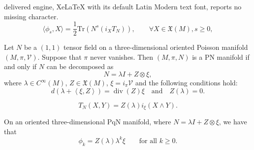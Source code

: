 \documentclass[10pt,a4paper]{amsart}
\begin{document}
delivered engine, XeLaTeX with its default Latin Modern text font, reports no missing character.
\begin{equation}
\langle\phi_s,X\rangle=\frac{1}{2}\text{Tr}(N^s(i_XT_N)),\qquad\forall X\in\mathfrak X(M), s\geq 0, \label{eq:phis}
\end{equation}

\begin{theorem}\label{theo:charN}
Let $N$ be a $(1,1)$ tensor field on a three-dimensional oriented Poisson manifold $(M,\pi,\mathcal V)$. Suppose that $\pi$ never vanishes.
Then $(M,\pi,N)$ is a PN manifold if and only if $N$ can be decomposed as 
\begin{equation}
N=\lambda I+Z\otimes\xi,\label{eq:chPN}
\end{equation}
where $\lambda\in C^\infty(M)$, $Z\in\mathfrak X(M)$, $\xi=i_\pi\mathcal V$ and the following conditions hold:
\begin{equation}
d\left(\lambda+\left<\xi,Z\right>\right)=\operatorname{div}(Z)\xi\quad\text{and}\quad Z(\lambda)=0.
\label{eq:contor}
\end{equation}
\end{theorem}

\begin{equation}
T_N(X,Y)=Z(\lambda)i_\xi(X\wedge Y).\label{eq: T_N 3D PqN}
\end{equation}

\begin{lem}\label{lem:phik}
	On an oriented three-dimensional PqN manifold, where $N=\lambda I+Z\otimes\xi$, we have that 
	\begin{equation}
		\phi_k=Z(\lambda)\lambda^k\xi\qquad\mbox{for all $k\geq 0$.}
		\label{eq:phik}
	\end{equation}
\end{lem}
\end{document}
